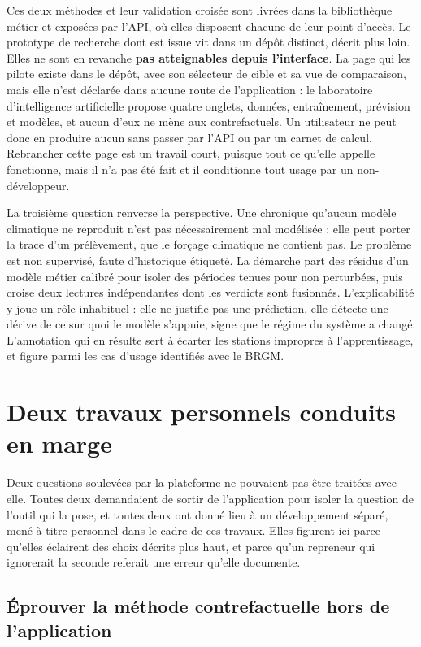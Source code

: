 Ces deux méthodes et leur validation croisée sont livrées dans la bibliothèque métier et
exposées par l'API, où elles disposent chacune de leur point d'accès. Le prototype de recherche
dont \physcf{} est issue vit dans un dépôt distinct, décrit plus loin. Elles ne sont en revanche
\textbf{pas atteignables depuis l'interface}. La page qui les pilote existe dans le dépôt, avec
son sélecteur de cible et sa vue de comparaison, mais elle n'est déclarée dans aucune route de
l'application : le laboratoire d'intelligence artificielle propose quatre onglets, données,
entraînement, prévision et modèles, et aucun d'eux ne mène aux contrefactuels. Un utilisateur ne
peut donc en produire aucun sans passer par l'API ou par un carnet de calcul. Rebrancher cette
page est un travail court, puisque tout ce qu'elle appelle fonctionne, mais il n'a pas été fait
et il conditionne tout usage par un non-développeur.

La troisième question renverse la perspective. Une chronique qu'aucun modèle climatique ne
reproduit n'est pas nécessairement mal modélisée : elle peut porter la trace d'un prélèvement,
que le forçage climatique ne contient pas. Le problème est non supervisé, faute d'historique
étiqueté. La démarche part des résidus d'un modèle métier calibré pour isoler des périodes
tenues pour non perturbées, puis croise deux lectures indépendantes dont les verdicts sont
fusionnés. L'explicabilité y joue un rôle inhabituel : elle ne justifie pas une prédiction, elle
détecte une dérive de ce sur quoi le modèle s'appuie, signe que le régime du système a changé.
L'annotation qui en résulte sert à écarter les stations impropres à l'apprentissage, et figure
parmi les cas d'usage identifiés avec le BRGM.

\section{Deux travaux personnels conduits en marge}
\label{sec:travaux-perso}

Deux questions soulevées par la plateforme ne pouvaient pas être traitées avec elle. Toutes deux
demandaient de sortir de l'application pour isoler la question de l'outil qui la pose, et toutes
deux ont donné lieu à un développement séparé, mené à titre personnel dans le cadre de ces
travaux. Elles figurent ici parce qu'elles éclairent des choix décrits plus haut, et parce qu'un
repreneur qui ignorerait la seconde referait une erreur qu'elle documente.

\subsection{Éprouver la méthode contrefactuelle hors de l'application}


